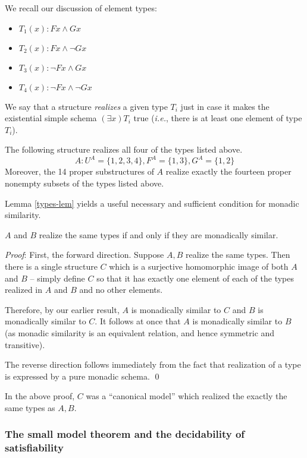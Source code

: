 We recall our discussion of element types:
\begin{itemize}
\item $T_1(x): Fx\wedge Gx$
\item $T_2(x): Fx\wedge \neg Gx$
\item $T_3(x): \neg Fx\wedge Gx$
\item $T_4(x): \neg Fx\wedge \neg Gx$
\end{itemize}
We say that a structure {\em realizes} a given type $T_i$ just in case it
makes the existential simple schema $(\exists x)T_i$ true (\textit{i.e.}, there is at least one element of type $T_i$).
\begin{example}\label{kinds-ex}
The following structure realizes all four of the types listed above.
\[A: U^A = \{1,2,3,4\}, F^A =\{1,3\}, G^A=\{1,2\}\]
Moreover, the 14 proper substructures of $A$ realize exactly the fourteen
proper nonempty subsets of the types listed above.
\end{example}
Lemma \ref{types-lem} yields a useful necessary and sufficient condition for monadic similarity. 
\begin{lemma}\label{types-lem}
$A$ and $B$ realize the same types if and only if they are
monadically similar.
\end{lemma} 
\emph{Proof}:
First, the forward direction. Suppose $A, B$ realize the same types. Then there is a single structure $C$ which is a surjective homomorphic image of both $A$ and $B$ -- simply define $C$ so that it has exactly one element of each of the types realized in $A$ and $B$ and no other elements.%

Therefore, by our earlier result, $A$ is monadically similar to $C$ and $B$ is
monadically similar to $C.$ It follows at once that $A$ is monadically similar
to $B$ (as monadic similarity is an equivalent relation, and hence symmetric and transitive). 

The reverse direction follows immediately from the fact that realization of a type is expressed by a pure monadic schema. \qed

In the above proof, $C$ was a ``canonical model'' which realized the exactly the same types as $A, B$.  

\subsubsection*{The small model theorem and the decidability of satisfiability}

